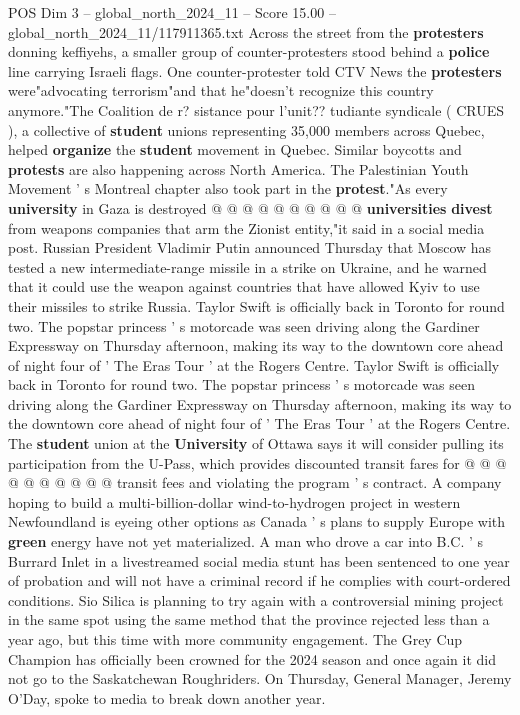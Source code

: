 \begin{textsample}{POS Dim 3 – global\_north\_2024\_11 – Score 15.00 – global\_north\_2024\_11/117911365.txt}
Across the street from the \textbf{protesters} donning keffiyehs, a smaller group of counter-protesters stood behind a \textbf{police} line carrying Israeli flags.
One counter-protester told CTV News the \textbf{protesters} were"advocating terrorism"and that he"doesn't recognize this country anymore."The Coalition de r? sistance pour l'unit?? tudiante syndicale ( CRUES ), a collective of \textbf{student} unions representing 35,000 members across Quebec, helped \textbf{organize} the \textbf{student} movement in Quebec.
Similar boycotts and \textbf{protests} are also happening across North America.
The Palestinian Youth Movement ' s Montreal chapter also took part in the \textbf{protest}."As every \textbf{university} in Gaza is destroyed @ @ @ @ @ @ @ @ @ @ \textbf{universities} \textbf{divest} from weapons companies that arm the Zionist entity,"it said in a social media post.
Russian President Vladimir Putin announced Thursday that Moscow has tested a new intermediate-range missile in a strike on Ukraine, and he warned that it could use the weapon against countries that have allowed Kyiv to use their missiles to strike Russia.
Taylor Swift is officially back in Toronto for round two.
The popstar princess ' s motorcade was seen driving along the Gardiner Expressway on Thursday afternoon, making its way to the downtown core ahead of night four of ' The Eras Tour ' at the Rogers Centre.
Taylor Swift is officially back in Toronto for round two.
The popstar princess ' s motorcade was seen driving along the Gardiner Expressway on Thursday afternoon, making its way to the downtown core ahead of night four of ' The Eras Tour ' at the Rogers Centre.
The \textbf{student} union at the \textbf{University} of Ottawa says it will consider pulling its participation from the U-Pass, which provides discounted transit fares for @ @ @ @ @ @ @ @ @ @ transit fees and violating the program ' s contract.
A company hoping to build a multi-billion-dollar wind-to-hydrogen project in western Newfoundland is eyeing other options as Canada ' s plans to supply Europe with \textbf{green} energy have not yet materialized.
A man who drove a car into B.C. ' s Burrard Inlet in a livestreamed social media stunt has been sentenced to one year of probation and will not have a criminal record if he complies with court-ordered conditions.
Sio Silica is planning to try again with a controversial mining project in the same spot using the same method that the province rejected less than a year ago, but this time with more community engagement.
The Grey Cup Champion has officially been crowned for the 2024 season and once again it did not go to the Saskatchewan Roughriders.
On Thursday, General Manager, Jeremy O'Day, spoke to media to break down another year.

\end{textsample}
